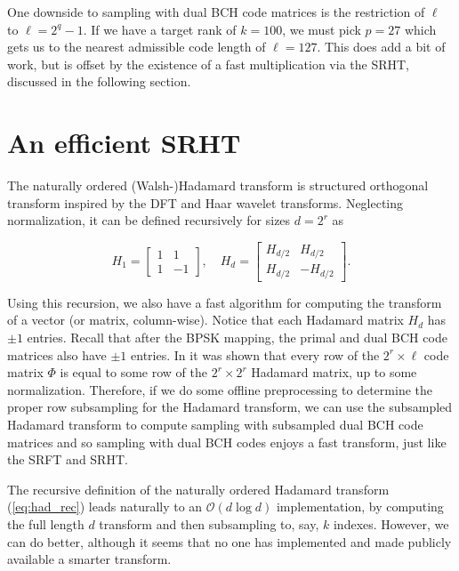 \documentclass[12pt]{article}
\begin{document}
One downside to sampling with dual BCH code matrices is the restriction of $\ell$ to $\ell=2^q-1$.  If we have a target rank of $k=100$, we must pick $p=27$ which gets us to the nearest admissible code length of $\ell=127$.  This does add a bit of work, but is offset by the existence of a fast multiplication via the SRHT, discussed in the following section.


\section{An efficient SRHT}
The naturally ordered (Walsh-)Hadamard transform is structured orthogonal transform inspired by the DFT and Haar wavelet transforms.  Neglecting normalization, it can be defined recursively for sizes $d=2^r$ as

\begin{equation}
\label{eq:had_rec}
H_1 = \begin{bmatrix}1 & 1\\1 & -1\end{bmatrix}, \quad H_d = \begin{bmatrix}H_{d/2}&H_{d/2}\\H_{d/2}&-H_{d/2}\end{bmatrix}.
\end{equation}

   \noindent Using this recursion, we also have a fast algorithm for computing the transform of a vector (or matrix, column-wise).  Notice that each Hadamard matrix $H_d$ has $\pm 1$ entries.  Recall that after the BPSK mapping, the primal and dual BCH code matrices also have $\pm 1$ entries.  In \cite{ailon2009fast} it was shown that every row of the $2^r\times \ell$ code matrix $\Phi$ is equal to some row of the $2^r\times 2^r$ Hadamard matrix, up to some normalization.  Therefore, if we do some offline preprocessing to determine the proper row subsampling for the Hadamard transform, we can use the subsampled Hadamard transform to compute sampling with subsampled dual BCH code matrices and so sampling with dual BCH codes enjoys a fast transform, just like the SRFT and SRHT.

   The recursive definition of the naturally ordered Hadamard transform (\ref{eq:had_rec}) leads naturally to an $\mathcal{O}(d\log d)$ implementation, by computing the full length $d$ transform and then subsampling to, say, $k$ indexes.  However, we can do better, although it seems that no one has implemented and made publicly available a smarter transform.
   
\end{document}
